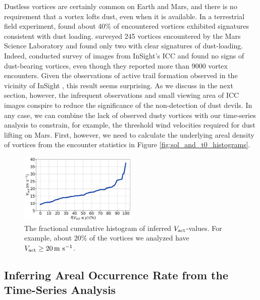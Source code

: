 \documentclass{aastex63}
\begin{document}
Dustless vortices are certainly common on Earth and Mars, and there is no requirement that a vortex lofts dust, even when it is available. In a terrestrial field experiment, \citet{LORENZ20151} found about 40\% of encountered vortices exhibited signatures consistent with dust loading. \citet{2016Icar..278..180S} surveyed 245 vortices encountered by the Mars Science Laboratory and found only two with clear signatures of dust-loading. Indeed, \citet{2020GeoRL..4787234P} conducted survey of images from InSight's ICC and found no signs of dust-bearing vortices, even though they reported more than 9000 vortex encounters. Given the observations of active trail formation observed in the vicinity of InSight \citep{2016Icar..266..315R, 2020GeoRL..4787234P}, this result seems surprising. As we discuss in the next section, however, the infrequent observations and small viewing area of ICC images conspire to reduce the significance of the non-detection of dust devils. In any case, we can combine the lack of observed dusty vortices with our time-series analysis to constrain, for example, the threshold wind velocities required for dust lifting on Mars. First, however, we need to calculate the underlying areal density of vortices from the encounter statistics in Figure \ref{fig:sol_and_t0_histograms}. 

\begin{figure}
    \centering
    \includegraphics[width=0.5\textwidth]{figures/cum_hist_Vact.png}
    \caption{The fractional cumulative histogram of inferred $V_{\rm act}$-values. For example, about 20\% of the vortices we analyzed have $V_{\rm act} \geq 20\,{\rm m\ s^{-1}}$.}
    \label{fig:cum_hist_Vact}
\end{figure}


\subsection{Inferring Areal Occurrence Rate from the Time-Series Analysis}
\label{sec:Inferring Dust Devil Density from the Time-Series Analysis}
\end{document}
